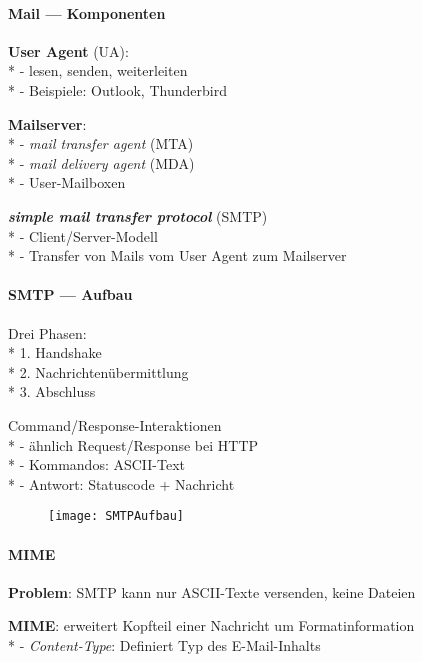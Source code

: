 \paragraph{Mail --- Komponenten}
\begin{items}
  \item \textbf{User Agent} (UA): \\*
    - lesen, senden, weiterleiten \\*
    - Beispiele: Outlook, Thunderbird
  \item \textbf{Mailserver}: \\*
    - \emph{mail transfer agent} (MTA) \\*
    - \emph{mail delivery agent} (MDA) \\*
    - User-Mailboxen
  \item \textbf{\emph{simple mail transfer protocol}} (SMTP) \\*
    - Client/Server-Modell \\*
    - Transfer von Mails vom User Agent zum Mailserver
\end{items}

\paragraph{SMTP --- Aufbau}
\begin{items}
  \item Drei Phasen: \\*
    1. Handshake \\*
    2. Nachrichtenübermittlung \\*
    3. Abschluss
  \item Command/Response-Interaktionen \\*
    - ähnlich Request/Response bei HTTP \\*
    - Kommandos: ASCII-Text \\*
    - Antwort: Statuscode + Nachricht
\end{items}
\begin{figure}[H]\centering\label{SMTPAufbau}\texttt{[image: SMTPAufbau]}\end{figure}

\paragraph{MIME}
\begin{items}
  \item \textbf{Problem}: SMTP kann nur ASCII-Texte versenden, keine Dateien
  \item \textbf{MIME}: erweitert Kopfteil einer Nachricht um Formatinformation \\*
    - \emph{Content-Type}: Definiert Typ des E-Mail-Inhalts
\end{items}

